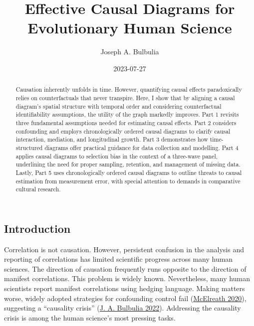 \documentclass[
  singlecolumn]{article}
\title{Effective Causal Diagrams for Evolutionary Human Science}
\author{Joseph A. Bulbulia}
\affil{%
                  Victoria University of Wellington, New Zealand, School
                  of Psychology, Centre for Applied Cross-Cultural
                  Research
              }
\date{2023-07-27}
\begin{document}
\maketitle
\begin{abstract}
Causation inherently unfolds in time. However, quantifying causal
effects paradoxically relies on counterfactuals that never transpire.
Here, I show that by aligning a causal diagram's spatial structure with
temporal order and considering counterfactual identifiability
assumptions, the utility of the graph markedly improves. Part 1 revisits
three fundamental assumptions needed for estimating causal effects. Part
2 considers confounding and employs chronologically ordered causal
diagrams to clarify causal interaction, mediation, and longitudinal
growth. Part 3 demonstrates how time-structured diagrams offer practical
guidance for data collection and modelling. Part 4 applies causal
diagrams to selection bias in the context of a three-wave panel,
underlining the need for proper sampling, retention, and management of
missing data. Lastly, Part 5 uses chronologically ordered causal
diagrams to outline threats to causal estimation from measurement error,
with special attention to demands in comparative cultural research.
\end{abstract}
\ifdefined\Shaded\renewenvironment{Shaded}{\begin{tcolorbox}[breakable, frame hidden, enhanced, interior hidden, borderline west={3pt}{0pt}{shadecolor}, sharp corners, boxrule=0pt]}{\end{tcolorbox}}\fi

\hypertarget{introduction}{%
\subsection{Introduction}\label{introduction}}

Correlation is not causation. However, persistent confusion in the
analysis and reporting of correlations has limited scientific progress
across many human sciences. The direction of causation frequently runs
opposite to the direction of manifest correlations. This problem is
widely known. Nevertheless, many human scientists report manifest
correlations using hedging language. Making matters worse, widely
adopted strategies for confounding control fail
(\protect\hyperlink{ref-mcelreath2020}{McElreath 2020}), suggesting a
``causality crisis'' (\protect\hyperlink{ref-bulbulia2022}{J. A.
Bulbulia 2022}). Addressing the causality crisis is among the human
science's most pressing tasks.
\end{document}
